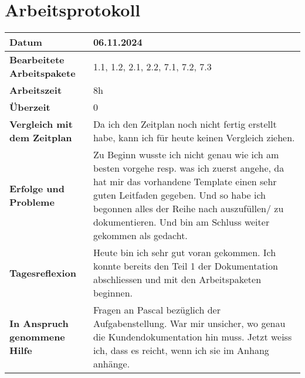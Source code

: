 \chapter{Arbeitsprotokoll}\label{ch:arbeitsprotokoll}
\renewcommand{\arraystretch}{1.5}
\begin{longtable}{p{}|p{}}
    \hline
    \textbf{Datum}                       & 06.11.2024\\
    \hline
    \textbf{Bearbeitete Arbeitspakete}   & 1.1, 1.2, 2.1, 2.2, 7.1, 7.2, 7.3\\
    \hline
    \textbf{Arbeitszeit}                 & 8h \\
    \hline
    \textbf{Überzeit}                    & 0 \\
    \hline
    \textbf{Vergleich mit dem Zeitplan}  & Da ich den Zeitplan noch nicht fertig erstellt habe, kann ich für heute keinen Vergleich ziehen. \\
    \hline
    \textbf{Erfolge und Probleme}        & Zu Beginn wusste ich nicht genau wie ich am besten vorgehe resp. was ich zuerst angehe, da hat mir das vorhandene Template einen sehr guten Leitfaden gegeben. Und so habe ich begonnen alles der Reihe nach auszufüllen/ zu dokumentieren. Und bin am Schluss weiter gekommen als gedacht.\\
    \hline
    \textbf{Tagesreflexion}              & Heute bin ich sehr gut voran gekommen. Ich konnte bereits den Teil 1 der Dokumentation abschliessen und mit den Arbeitspaketen beginnen.
    \\
    \hline
    \textbf{In Anspruch genommene Hilfe} & Fragen an Pascal bezüglich der Aufgabenstellung. War mir unsicher, wo genau die Kundendokumentation hin muss. Jetzt weiss ich, dass es reicht, wenn ich sie im Anhang anhänge.\\
    \hline
\end{longtable}\label{tab:arbeitsprotokoll-tag1} 

\newpage

